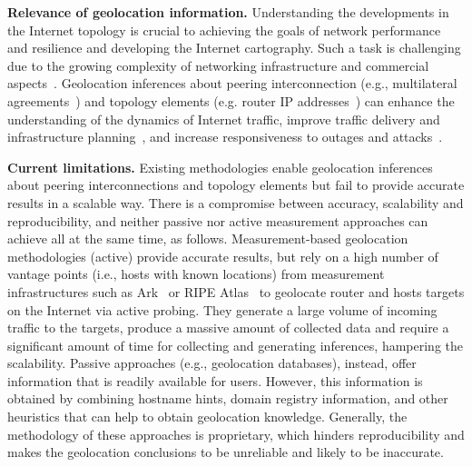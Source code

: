 	\textbf{Relevance of geolocation information.} 
	Understanding the developments in the Internet topology is crucial to achieving the goals of network performance and resilience and developing the Internet cartography. Such a task is challenging due to the growing complexity of networking infrastructure and commercial aspects~\cite{Giotsas:2015:MPI:2716281.2836122}. Geolocation inferences about peering interconnection (e.g., multilateral agreements~\cite{Giotsas:2013}) and topology elements (e.g. router IP addresses~\cite{8002903,Huffaker:2014:DDR:2656877.2656879}) can enhance the understanding of the dynamics of Internet traffic, improve traffic delivery and infrastructure planning~\cite{Calder:2013:MEG:2504730.2504754}, and increase responsiveness to outages and attacks~\cite{Giotsas:2017:DPI:3098822.3098855, marcos:2018:dynamix}. 


	\textbf{Current limitations.} Existing methodologies enable geolocation inferences about peering interconnections and topology elements but fail to provide accurate results in a scalable way. There is a compromise between accuracy, scalability and reproducibility, and neither passive nor active measurement approaches can achieve all at the same time, as follows. Measurement-based geolocation methodologies (active) provide accurate results, but rely on a high number of vantage points (i.e., hosts with known locations) from measurement infrastructures such as Ark~\cite{ark} or RIPE Atlas~\cite{ripeatlas} to geolocate router and hosts targets on the Internet via active probing. They generate a large volume of incoming traffic to the targets, produce a massive amount of collected data and require a significant amount of time for collecting and generating inferences, hampering the scalability.  Passive approaches (e.g., geolocation databases), instead, offer information that is readily available for users. However, this information is obtained by combining hostname hints, domain registry information, and other heuristics that can help to obtain geolocation knowledge. Generally, the methodology of these approaches is proprietary, which hinders reproducibility and makes the geolocation conclusions to be unreliable and likely to be inaccurate.

